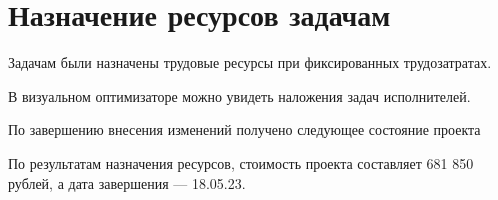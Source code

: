 \section{Назначение ресурсов задачам}

Задачам были назначены трудовые ресурсы при фиксированных трудозатратах.


В визуальном оптимизаторе можно увидеть наложения задач исполнителей.


По завершению внесения изменений получено следующее состояние проекта

По результатам назначения ресурсов, стоимость проекта составляет 681 850 рублей, а дата завершения --- 18.05.23.